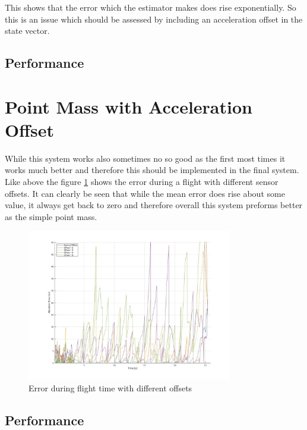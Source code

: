 This shows that the error which the estimator makes does rise exponentially.
So this is an issue which should be assessed by including an acceleration offset in the state vector.

\subsection{Performance}


\section{Point Mass with Acceleration Offset}
While this system works also sometimes no so good as the first most times it works much better and therefore this should be implemented in the final system.
Like above the figure \ref{fig:PointMassOffsetErrorWithOffset} shows the error during a flight with different sensor offsets.
It can clearly be seen that while the mean error does rise about some value, it always get back to zero and therefore overall this system preforms better as the simple point mass.

\begin{figure}[h!]
 \centering
 \includegraphics[width=0.8\textwidth]{./Pictures/PointMassOffsetErrorWithOffset.jpg}
  \caption{Error during flight time with different offsets}
 \label{fig:PointMassOffsetErrorWithOffset}
\end{figure}
 
\subsection{Performance}


